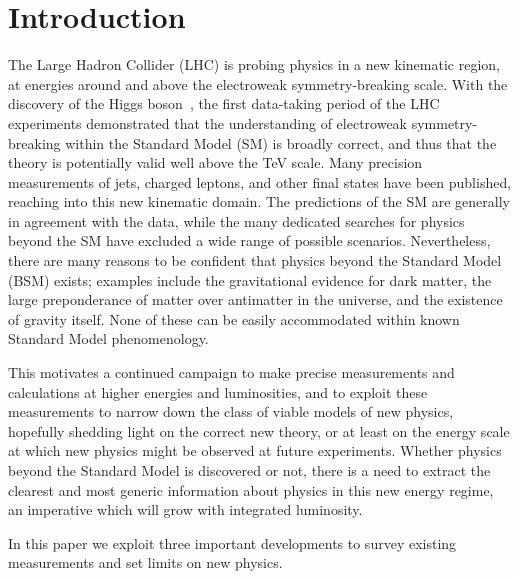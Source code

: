 \documentclass[floatfix]{article}
\begin{document}
\section{Introduction}
\label{sec:intro}
The Large Hadron Collider (LHC) is probing physics in a new kinematic region, at energies around and above the 
electroweak symmetry-breaking scale. With the discovery of the Higgs boson~\cite{Aad:2012tfa,Chatrchyan:2012ufa}, 
the first data-taking period of the LHC experiments demonstrated that the understanding of electroweak symmetry-breaking within
the Standard Model (SM) is broadly correct, and thus that the theory is potentially valid well above the
TeV scale. Many precision measurements of jets, charged leptons, and other final states 
have been published, reaching into this new kinematic domain. The predictions of the SM are 
generally in agreement with the data, while the many dedicated searches for physics beyond the SM
have excluded a wide range of possible scenarios. 
Nevertheless, there are many reasons to be confident that
physics beyond the Standard Model (BSM) exists; examples include the gravitational evidence for dark matter, the large 
preponderance of matter over antimatter in the universe, and the existence of gravity itself. None of 
these can be easily accommodated within known Standard Model phenomenology. 

This motivates a continued campaign to make precise measurements and calculations at higher energies and 
luminosities, and to exploit these measurements to narrow down the class of viable models of new physics, 
hopefully shedding light on the correct new theory, or at least on the energy scale at which
new physics might be observed at future experiments. Whether physics beyond the Standard Model is discovered 
or not, there is a need to extract the clearest and most generic information about physics in this new energy regime,
an imperative which will grow with integrated luminosity. 

In this paper we exploit three important developments to survey existing measurements and set 
limits on new physics. 
\end{document}
